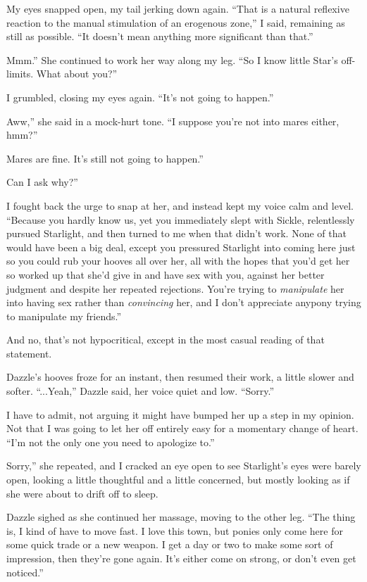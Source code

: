 My eyes snapped open, my tail jerking down again. “That is a natural reflexive reaction to the manual stimulation of an erogenous zone,” I said, remaining as still as possible. “It doesn’t mean anything more significant than that.”

\leavevmode{}Mmm.” She continued to work her way along my leg. “So I know little Star’s off-limits. What about you?”

I grumbled, closing my eyes again. “It’s not going to happen.”

\leavevmode{}Aww,” she said in a mock-hurt tone. “I suppose you’re not into mares either, hmm?”

\leavevmode{}Mares are fine. It’s still not going to happen.”

\leavevmode{}Can I ask why?”

I fought back the urge to snap at her, and instead kept my voice calm and level. “Because you hardly know us, yet you immediately slept with Sickle, relentlessly pursued Starlight, and then turned to me when that didn’t work. None of that would have been a big deal, except you pressured Starlight into coming here just so you could rub your hooves all over her, all with the hopes that you’d get her so worked up that she’d give in and have sex with you, against her better judgment and despite her repeated rejections. You’re trying to \textit{manipulate} her into having sex rather than \textit{convincing} her, and I don’t appreciate anypony trying to manipulate my friends.”

And no, that’s not hypocritical, except in the most casual reading of that statement.

Dazzle’s hooves froze for an instant, then resumed their work, a little slower and softer. “...Yeah,” Dazzle said, her voice quiet and low. “Sorry.”

I have to admit, not arguing it might have bumped her up a step in my opinion. Not that I was going to let her off entirely easy for a momentary change of heart. “I’m not the only one you need to apologize to.”

\leavevmode{}Sorry,” she repeated, and I cracked an eye open to see Starlight’s eyes were barely open, looking a little thoughtful and a little concerned, but mostly looking as if she were about to drift off to sleep.

Dazzle sighed as she continued her massage, moving to the other leg. “The thing is, I kind of have to move fast. I love this town, but ponies only come here for some quick trade or a new weapon. I get a day or two to make some sort of impression, then they’re gone again. It’s either come on strong, or don’t even get noticed.”

